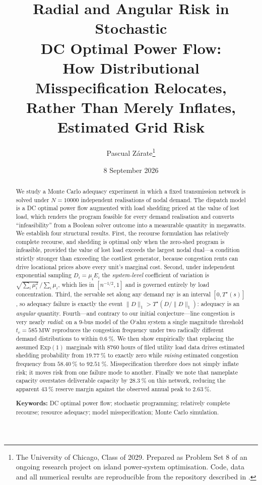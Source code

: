 \documentclass[11pt,a4paper]{article}
\title{\bfseries Radial and Angular Risk in Stochastic\\ DC Optimal Power Flow:\\[0.25em]
\large How Distributional Misspecification Relocates,\\ Rather Than Merely Inflates, Estimated Grid Risk}
\author{Pascual Z\'arate\thanks{The University of Chicago, Class of 2029.
Prepared as Problem Set 8 of an ongoing research project on island power-system
optimisation. Code, data and all numerical results are reproducible from the
repository described in \Cref{app:repro}.}}
\date{8 September 2026}
\theoremstyle{definition}
\theoremstyle{plain}
\theoremstyle{remark}
\newcommand{\okina}{\textquoteleft}
\begin{document}
\maketitle

\begin{abstract}
\noindent
We study a Monte Carlo adequacy experiment in which a fixed transmission network
is solved under $N = \num{10000}$ independent realisations of nodal demand. The
dispatch model is a DC optimal power flow augmented with load shedding priced at
the value of lost load, which renders the program feasible for every demand
realisation and converts ``infeasibility'' from a Boolean solver outcome into a
measurable quantity in megawatts. We establish four structural results. First,
the recourse formulation has relatively complete recourse, and shedding is
optimal only when the zero-shed program is infeasible, provided the value of
lost load exceeds the largest nodal dual---a condition strictly stronger than
exceeding the costliest generator, because congestion rents can drive locational
prices above every unit's marginal cost. Second, under independent exponential
sampling $D_i = \mu_i E_i$ the \emph{system-level} coefficient of variation is
$\sqrt{\sum_i \mu_i^2}\,/\sum_i \mu_i$, which lies in $[n^{-1/2}, 1]$ and is
governed entirely by load concentration. Third, the servable set along any
demand ray is an interval $[0, T^\star(s)]$, so adequacy failure is exactly the
event $\lVert D\rVert_1 > T^\star(D/\lVert D\rVert_1)$: adequacy is an
\emph{angular} quantity. Fourth---and contrary to our initial conjecture---line
congestion is very nearly \emph{radial}: on a $9$-bus model of the O\okina ahu
system a single magnitude threshold $t_c = \SI{585}{\mega\watt}$ reproduces the
congestion frequency under two radically different demand distributions to
within $\SI{0.6}{\percent}$. We then show empirically that replacing the assumed
$\mathrm{Exp}(1)$ marginals with \num{8760} hours of filed utility load data
drives estimated shedding probability from $\SI{19.77}{\percent}$ to exactly
zero while \emph{raising} estimated congestion frequency from
$\SI{58.40}{\percent}$ to $\SI{92.51}{\percent}$. Misspecification therefore does
not simply inflate risk; it moves risk from one failure mode to another. Finally
we note that nameplate capacity overstates deliverable capacity by
$\SI{28.3}{\percent}$ on this network, reducing the apparent
$\SI{43}{\percent}$ reserve margin against the observed annual peak to
$\SI{2.63}{\percent}$.

\medskip
\noindent\textbf{Keywords:} DC optimal power flow; stochastic programming;
relatively complete recourse; resource adequacy; model misspecification;
Monte Carlo simulation.
\end{abstract}
\end{document}
